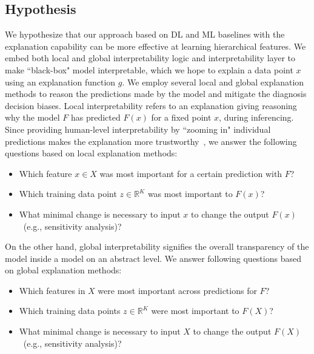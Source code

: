 \subsection{Hypothesis}
We hypothesize that our approach based on DL and ML baselines with the explanation capability can be more effective at learning hierarchical features. We embed both local and global interpretability logic and interpretability layer to make ``black-box" model interpretable, which we hope to explain a data point $x$ using an explanation function $g$. We employ several local and global explanation methods to reason the predictions made by the model and mitigate the diagnosis decision biases. Local interpretability refers to an explanation giving reasoning why the model $F$ has predicted $F(x)$ for a fixed point $x$, during inferencing. Since providing human-level interpretability by ``zooming in" individual predictions makes the explanation more trustworthy~\cite{ribeiro2018anchors}, we answer the following questions based on local explanation methods: 

\begin{itemize}[noitemsep]
    \item Which feature $x \in X$ was most important for a certain prediction with $F$? 
    \item Which training data point $z \in \mathbb{R}^{K}$ was most important to $F(x)$? 
    \item What minimal change is necessary to input $x$ to change the output $F(x)$~(e.g., sensitivity analysis)? 
\end{itemize}

\hspace*{3.5mm} On the other hand, global interpretability signifies the overall transparency of the model inside a model on an abstract level. We answer following questions based on global explanation methods: 

\begin{itemize}[noitemsep]
    \item Which features in $X$ were most important across predictions for $F$? 
    \item Which training data points $z \in \mathbb{R}^{K}$ were most important to $F(X)$? 
    \item What minimal change is necessary to input $X$ to change the output $F(X)$~(e.g., sensitivity analysis)? 
\end{itemize}

